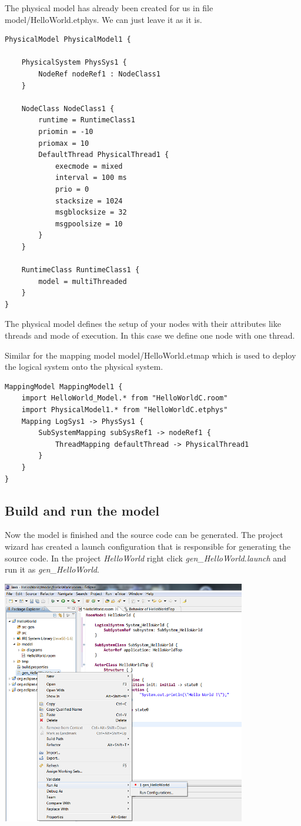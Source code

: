 The physical model has already been created for us in file model/HelloWorld.etphys.
We can just leave it as it is.

\begin{lstlisting}[language=etPhys]
PhysicalModel PhysicalModel1 {

	PhysicalSystem PhysSys1 {
		NodeRef nodeRef1 : NodeClass1
	}

	NodeClass NodeClass1 {
		runtime = RuntimeClass1
		priomin = -10
		priomax = 10
		DefaultThread PhysicalThread1 {
			execmode = mixed
			interval = 100 ms
			prio = 0
			stacksize = 1024
			msgblocksize = 32
			msgpoolsize = 10
		}
	}

	RuntimeClass RuntimeClass1 {
		model = multiThreaded
	}
}
\end{lstlisting}

The physical model defines the setup of your nodes with their attributes like threads and mode of execution. In this case we define one node with one thread. 

Similar for the mapping model model/HelloWorld.etmap which is used to deploy the logical system onto the physical system.

\begin{lstlisting}[language=etMap]
MappingModel MappingModel1 {
	import HelloWorld_Model.* from "HelloWorldC.room"
	import PhysicalModel1.* from "HelloWorldC.etphys"
	Mapping LogSys1 -> PhysSys1 {
		SubSystemMapping subSysRef1 -> nodeRef1 {
			ThreadMapping defaultThread -> PhysicalThread1
		}
	}
}
\end{lstlisting}



\subsection{Build and run the model}

Now the model is finished and the source code can be generated. The project wizard has created a launch 
configuration that is responsible for generating the source code. In the project \textit{HelloWorld} right click \emph{gen\_HelloWorld.launch} and run it as \emph{gen\_HelloWorld}. 

\includegraphics[width=0.8\textwidth]{images/015-HelloWorld06.png}

